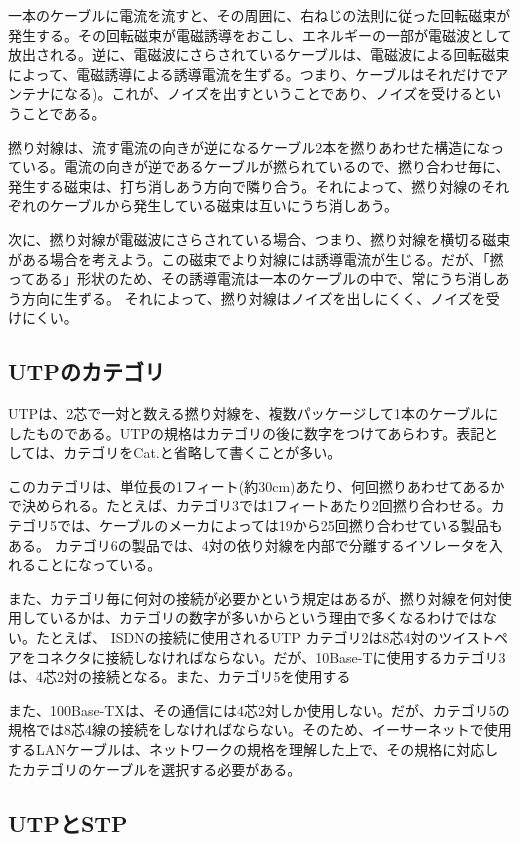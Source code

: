 一本のケーブルに電流を流すと、その周囲に、右ねじの法則に従った回転磁束が発生する。その回転磁束が電磁誘導をおこし、エネルギーの一部が電磁波として放出される。逆に、電磁波にさらされているケーブルは、電磁波による回転磁束によって、電磁誘導による誘導電流を生ずる。つまり、ケーブルはそれだけでアンテナになる)。これが、ノイズを出すということであり、ノイズを受けるということである。

撚り対線は、流す電流の向きが逆になるケーブル2本を撚りあわせた構造になっている。電流の向きが逆であるケーブルが撚られているので、撚り合わせ毎に、発生する磁束は、打ち消しあう方向で隣り合う。それによって、撚り対線のそれぞれのケーブルから発生している磁束は互いにうち消しあう。

次に、撚り対線が電磁波にさらされている場合、つまり、撚り対線を横切る磁束がある場合を考えよう。この磁束でより対線には誘導電流が生じる。だが、「撚ってある」形状のため、その誘導電流は一本のケーブルの中で、常にうち消しあう方向に生ずる。
それによって、撚り対線はノイズを出しにくく、ノイズを受けにくい。

\subsection{UTPのカテゴリ}

UTPは、2芯で一対と数える撚り対線を、複数パッケージして1本のケーブルにしたものである。UTPの規格はカテゴリの後に数字をつけてあらわす。表記としては、カテゴリをCat.と省略して書くことが多い。

このカテゴリは、単位長の1フィート(約30cm)あたり、何回撚りあわせてあるかで決められる。たとえば、カテゴリ3では1フィートあたり2回撚り合わせる。カテゴリ5では、ケーブルのメーカによっては19から25回撚り合わせている製品もある。
カテゴリ6の製品では、4対の依り対線を内部で分離するイソレータを入れることになっている。

また、カテゴリ毎に何対の接続が必要かという規定はあるが、撚り対線を何対使用しているかは、カテゴリの数字が多いからという理由で多くなるわけではない。たとえば、 ISDNの接続に使用されるUTP カテゴリ2は8芯4対のツイストペアをコネクタに接続しなければならない。だが、10Base-Tに使用するカテゴリ3は、4芯2対の接続となる。また、カテゴリ5を使用する 

また、100Base-TXは、その通信には4芯2対しか使用しない。だが、カテゴリ5の規格では8芯4線の接続をしなければならない。そのため、イーサーネットで使用するLANケーブルは、ネットワークの規格を理解した上で、その規格に対応したカテゴリのケーブルを選択する必要がある。



\subsection{UTPとSTP}

